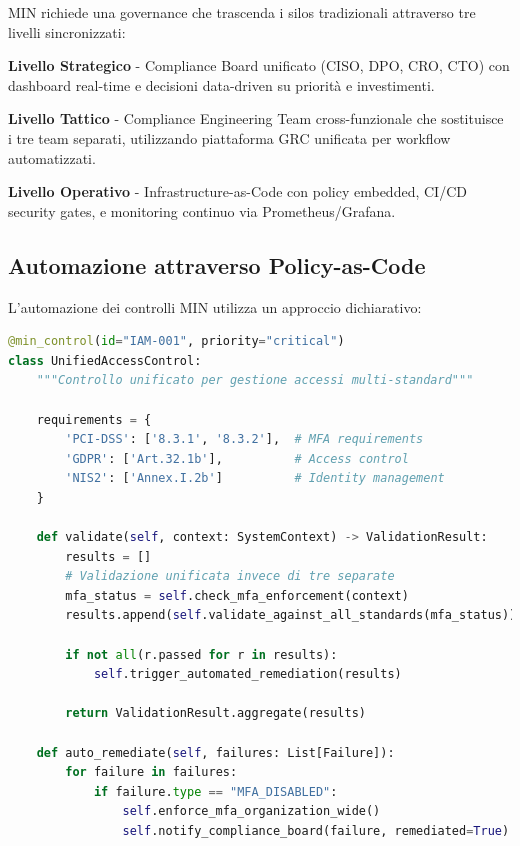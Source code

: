 MIN richiede una governance che trascenda i silos tradizionali attraverso tre livelli sincronizzati:

\textbf{Livello Strategico} - Compliance Board unificato (CISO, DPO, CRO, CTO) con dashboard real-time e decisioni data-driven su priorità e investimenti.

\textbf{Livello Tattico} - Compliance Engineering Team cross-funzionale che sostituisce i tre team separati, utilizzando piattaforma GRC unificata per workflow automatizzati.

\textbf{Livello Operativo} - Infrastructure-as-Code con policy embedded, CI/CD security gates, e monitoring continuo via Prometheus/Grafana.

\subsection{\texorpdfstring{Automazione attraverso Policy-as-Code}{4.5.2 - Policy-as-Code}}

L'automazione dei controlli MIN utilizza un approccio dichiarativo:

\begin{lstlisting}[language=Python, caption={Controllo MIN unificato in Policy-as-Code}, label={lst:min_control}]
@min_control(id="IAM-001", priority="critical")
class UnifiedAccessControl:
    """Controllo unificato per gestione accessi multi-standard"""
    
    requirements = {
        'PCI-DSS': ['8.3.1', '8.3.2'],  # MFA requirements
        'GDPR': ['Art.32.1b'],          # Access control
        'NIS2': ['Annex.I.2b']          # Identity management
    }
    
    def validate(self, context: SystemContext) -> ValidationResult:
        results = []
        # Validazione unificata invece di tre separate
        mfa_status = self.check_mfa_enforcement(context)
        results.append(self.validate_against_all_standards(mfa_status))
        
        if not all(r.passed for r in results):
            self.trigger_automated_remediation(results)
        
        return ValidationResult.aggregate(results)
    
    def auto_remediate(self, failures: List[Failure]):
        for failure in failures:
            if failure.type == "MFA_DISABLED":
                self.enforce_mfa_organization_wide()
                self.notify_compliance_board(failure, remediated=True)
\end{lstlisting}

